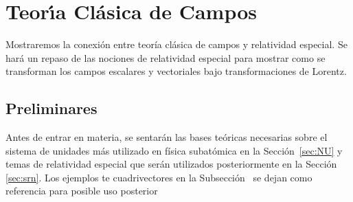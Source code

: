 \chapter{Teor\'\i a Cl\'asica de Campos}
\label{chap:tcc} %
Mostraremos la conexión entre teoría clásica de campos y relatividad especial.
Se hará un repaso de las nociones de relatividad especial para mostrar como se transforman los campos escalares y vectoriales bajo transformaciones de Lorentz.

\section{Preliminares}
Antes de entrar en materia, se sentarán las bases teóricas necesarias sobre el sistema de unidades  más utilizado en física subatómica en la Sección~\ref{sec:NU} y temas de relatividad especial que serán utilizados posteriormente en la Sección \ref{sec:srn}. Los ejemplos te cuadrivectores en la Subsección~ se dejan como referencia para posible uso posterior
